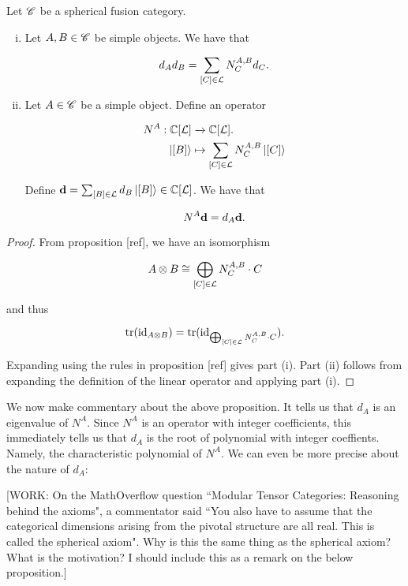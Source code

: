 \begin{proposition} Let $\mathscr{C}$ be a spherical fusion category.

\begin{enumerate}[(i)]
\item Let $A,B\in \mathscr{C}$ be simple objects. We have that

$$d_Ad_B=\sum_{[C]\in \mathcal{L}}N^{A,B}_C d_C.$$

\item Let $A\in \mathscr{C}$ be a simple object. Define an operator

 \begin{align*}
N^{A}:\mathbb{C}[\mathcal{L}]&\xrightarrow{} \mathbb{C}[\mathcal{L}].\\
\ket{[B]}&\mapsto \sum_{[C]\in \mathcal{L}} N^{A,B}_C \ket{[C]}
\end{align*}

Define $\bold{d} = \sum_{[B]\in \mathcal{L}} d_{B}\ket{[B]}\in \mathbb{C}[\mathcal{L}]$. We have that

$$N^{A}\bold{d}=d_{A}\bold{d}.$$

\end{enumerate}

\end{proposition}
\begin{proof} From proposition [ref], we have an isomorphism

$$A\otimes B \cong \bigoplus_{[C]\in \mathcal{L}}N^{A,B}_{C}\cdot C$$

and thus

$$\operatorname{tr}(\operatorname{id}_{A\otimes B})=\operatorname{tr}(\operatorname{id}_{\bigoplus_{[C]\in \mathcal{L}}N^{A,B}_{C}\cdot C}).$$

Expanding using the rules in proposition [ref] gives part (i). Part (ii) follows from expanding the definition of the linear operator and applying part (i).
\end{proof}

We now make commentary about the above proposition. It tells us that $d_A$ is an eigenvalue of $N^A$. Since $N^A$ is an operator with integer coefficients, this immediately tells us that $d_A$ is the root of polynomial with integer coeffients. Namely, the characteristic polynomial of $N^A$. We can even be more precise about the nature of $d_A$:

[WORK: On the MathOverflow question ``Modular Tensor Categories: Reasoning behind the axioms", a commentator said ``You also have to assume that the categorical dimensions arising from the pivotal structure are all real. This is called the spherical axiom". Why is this the same thing as the spherical axiom? What is the motivation? I should include this as a remark on the below proposition.]

